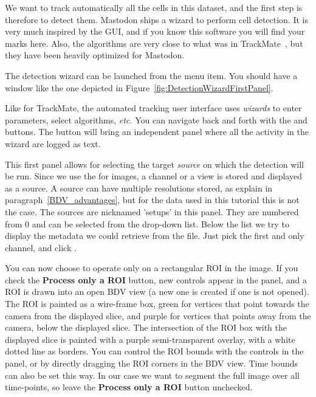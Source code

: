 We want to track automatically all the cells in this dataset, and the first step is therefore to detect them.
Mastodon ships a wizard to perform cell detection. 
It is very much inspired by the  GUI, and if you know this software you will find your marks here.
Also, the algorithms are very close to what was in TrackMate~\cite{TrackMate}, but they have been heavily optimized for Mastodon.

The detection wizard can be launched from the  menu item. 
You should have a window like the one depicted in Figure~\ref{fig:DetectionWizardFirstPanel}.

Like for TrackMate, the automated tracking user interface uses \textit{wizards} to enter parameters, select algorithms, \textit{etc.}
You can navigate back and forth with the  and   buttons. 
The  button will bring an independent panel where all the activity in the wizard are logged as text. 

This first panel allows for selecting the target \textit{source} on which the detection will be run. 
Since we use the \bdv for images, a channel or a view is stored and displayed as a source. 
A source can have multiple resolutions stored, as explain in paragraph~\ref{BDV_advantages}, but for the data used in this tutorial this is not the case. The sources are nicknamed 'setups' in this panel.
They are numbered from 0 and can be selected from the drop-down list. 
Below the list we try to display the metadata we could retrieve from the \bdv file.
Just pick the first and only channel, and click .

You can now choose to operate only on a rectangular ROI in the image. 
If you check the \textbf{Process only a ROI} button, new controls appear in the panel, and a ROI is drawn into an open BDV view (a new one is created if one is not opened).
The ROI is painted as a wire-frame box, green for vertices that point towards the camera from the displayed slice, and purple for vertices that points away from the camera, below the displayed slice.
The intersection of the ROI box with the displayed slice is painted with a purple semi-transparent overlay, with a white dotted line as borders.
You can control the ROI bounds with the controls in the panel, or by directly dragging the ROI corners in the BDV view.
Time bounds can also be set this way. In our case we want to segment the full image over all time-points, so leave the \textbf{Process only a ROI} button unchecked.

